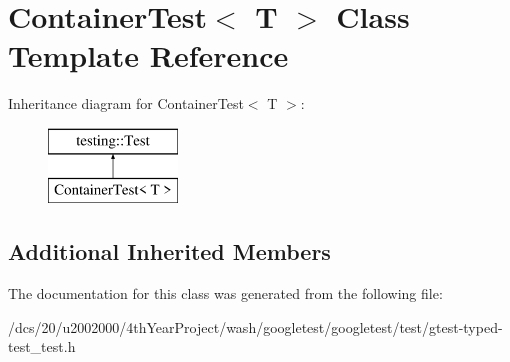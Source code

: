\hypertarget{classContainerTest}{}\section{Container\+Test$<$ T $>$ Class Template Reference}
\label{classContainerTest}
Inheritance diagram for Container\+Test$<$ T $>$\+:\begin{figure}[H]
\begin{center}
\leavevmode
\includegraphics[height=2.000000cm]{classContainerTest}
\end{center}
\end{figure}
\subsection*{Additional Inherited Members}


The documentation for this class was generated from the following file\+:\begin{DoxyCompactItemize}
\item 
/dcs/20/u2002000/4th\+Year\+Project/wash/googletest/googletest/test/gtest-\/typed-\/test\+\_\+test.\+h\end{DoxyCompactItemize}
